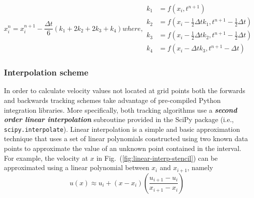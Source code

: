 \begin{subequations}
    \begin{equation}
        x^{n}_{i} = x^{n+1}_{i} 
                        - \frac{\Delta t}{6}
                        \left(k_{1} + 2 k_{2} + 2 k_{3} + k_{4} \right)
    \end{equation}
    where, 
    \begin{align}
        k_{1} & = f\left(x_{i}, t^{n+1}\right)  \\
        k_{2} & = f\left(x_{i} - \frac{1}{2}\Delta t k_{1}, t^{n+1}-\frac{1}{2} \Delta t\right) \\
        k_{3} & = f\left(x_{i} - \frac{1}{2}\Delta t k_{2}, t^{n+1}-\frac{1}{2} \Delta t\right) \\
        k_{4} & = f\left(x_{i} - \Delta t k_{3}, t^{n+1}- \Delta t\right)
    \end{align}
\end{subequations}

\subsubsection{Interpolation scheme}
In order to calculate velocity values not located at grid points both the
forwards and backwards tracking schemes take advantage of pre-compiled
Python integration libraries. More specifically, both tracking algorithms
use a \emph{\textbf{second order linear interpolation}} subroutine provided
in the SciPy package (i.e., \texttt{scipy.interpolate}). Linear
interpolation is a simple and basic approximation technique that uses a set
of linear polynomials constructed using two known data points to
approximate the value of an unknown point contained in the interval. For
example, the velocity at $x$ in Fig.~(\ref{fig:linear-interp-stencil}) can
be approximated using a linear polynomial between $x_{i}$ and $x_{i+1}$,
namely
\begin{equation}
    u(x) \approx u_{i} + \left(x-x_{i}\right) 
                    \left(\frac{u_{i+1} - u_{i}}{x_{i+1} - x_{i}}\right) 
\end{equation}

